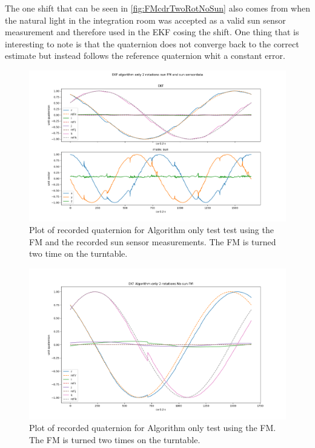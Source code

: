 The one shift that can be seen in \autoref{fig:FMcdrTwoRotNoSun} also comes from when the natural light in the integration room was accepted as a valid sun sensor measurement and therefore used in the EKF cosing the shift. One thing that is interesting to note is that the quaternion does not converge back to the correct estimate but instead follows the reference quaternion whit a constant error.

\begin{figure}[tbp]
	\centering
	\includegraphics[width=1\columnwidth]{./Pictures/test1EKFandSUN}
	\caption{Plot of recorded quaternion for Algorithm only test test using the FM and the recorded sun sensor measurements. The FM is turned two time on the turntable.}
	\label{fig:FMcdrTwoRotSun}
\end{figure}

\begin{figure}[tbp]
	\centering
	\includegraphics[width=1\columnwidth]{./Pictures/EKF_Algorithm_only_2_rotations_No_sun_FM}
	\caption{Plot of recorded quaternion for Algorithm only test using the FM. The FM is turned two times on the turntable.}
	\label{fig:FMcdrTwoRotNoSun}
\end{figure}   


